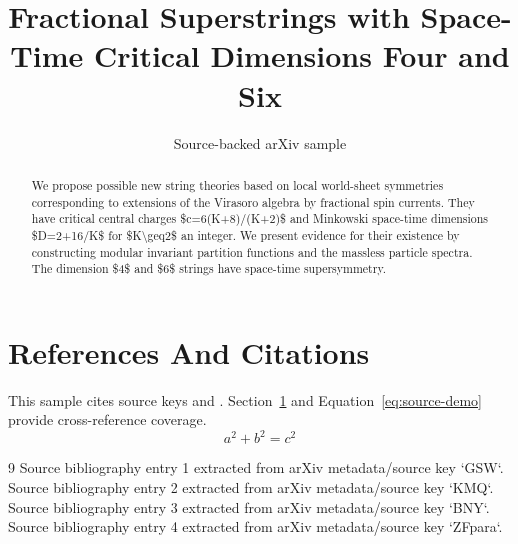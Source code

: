 \documentclass[11pt]{article}
\title{Fractional Superstrings with Space-Time Critical Dimensions Four and Six}
\author{Source-backed arXiv sample}
\date{}
\begin{document}
\maketitle
\begin{abstract}
We propose possible new string theories based on local world-sheet symmetries corresponding to extensions of the Virasoro algebra by fractional spin currents. They have critical central charges \$c=6(K+8)/(K+2)\$ and Minkowski space-time dimensions \$D=2+16/K\$ for \$K\textbackslash{}geq2\$ an integer. We present evidence for their existence by constructing modular invariant partition functions and the massless particle spectra. The dimension \$4\$ and \$6\$ strings have space-time supersymmetry.
\end{abstract}
\section{References And Citations}
\label{sec:refs}
This sample cites source keys \cite{GSW} and \cite{KMQ}. Section~\ref{sec:refs} and Equation~\ref{eq:source-demo} provide cross-reference coverage.
\begin{equation}
\label{eq:source-demo}
a^2 + b^2 = c^2
\end{equation}
\begin{thebibliography}{9}
 Source bibliography entry 1 extracted from arXiv metadata/source key `GSW`.
 Source bibliography entry 2 extracted from arXiv metadata/source key `KMQ`.
 Source bibliography entry 3 extracted from arXiv metadata/source key `BNY`.
 Source bibliography entry 4 extracted from arXiv metadata/source key `ZFpara`.
\end{thebibliography}
\end{document}
